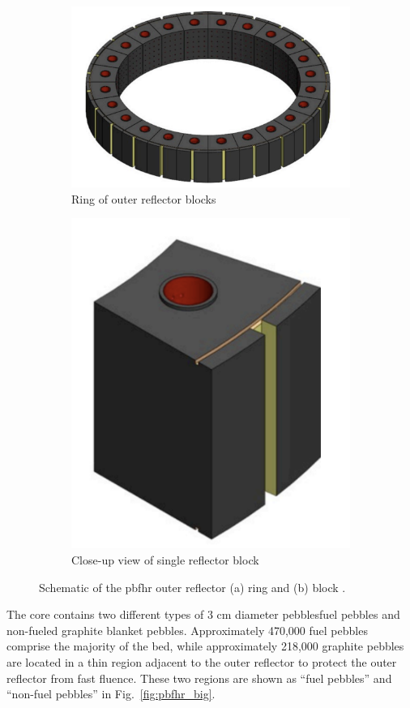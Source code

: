 \begin{figure}[h!]
    \begin{subfigure}{0.5\linewidth}
        \centering
        \includegraphics[height=0.6\linewidth]{figs/or_ring.png}
       \caption{Ring of outer reflector blocks}
       \label{fig:ring}
    \end{subfigure}
    \begin{subfigure}{0.5\linewidth}
        \centering
        \includegraphics[height=0.6\linewidth]{figs/or_block.png}
        \caption{Close-up view of single reflector block}
        \label{fig:block}
    \end{subfigure}
    \caption{Schematic of the \gls{pbfhr} outer reflector (a) ring and (b) block \cite{pbfhr}.}
    \label{fig:pbfhr_ring}
\end{figure}

The core contains two different types of 3 \si{\centi\meter} diameter pebbles\mdash fuel pebbles and non-fueled graphite blanket pebbles. Approximately 470,000 fuel pebbles comprise the majority of the bed, while approximately 218,000 graphite pebbles are located in a thin region adjacent to the outer reflector to protect the outer reflector from fast fluence. These two regions are shown as ``fuel pebbles'' and ``non-fuel pebbles'' in Fig.\ \ref{fig:pbfhr_big}. 


